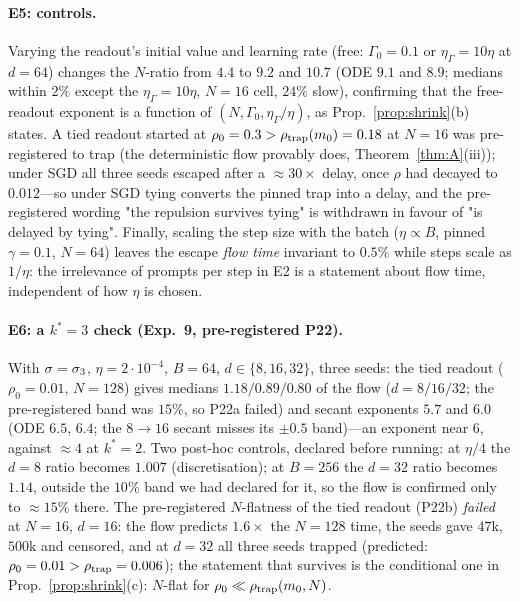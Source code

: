\paragraph{E5: controls.}
Varying the readout's initial value and learning rate (free: $\Gamma_0=0.1$ or $\eta_\Gamma=10\eta$ at $d=64$) changes the $N$-ratio from $4.4$ to
$9.2$ and $10.7$ (ODE $9.1$ and $8.9$; medians within $2\%$ except the $\eta_\Gamma=10\eta$, $N=16$ cell, $24\%$ slow), confirming that the
free-readout exponent is a function of $(N,\Gamma_0,\eta_\Gamma/\eta)$, as Prop.~\ref{prop:shrink}(b) states. A tied readout started at $\rho_0=0.3>\rho_{\rm trap}(m_0)=0.18$ at $N=16$ was pre-registered to trap (the deterministic flow provably does, Theorem~\ref{thm:A}(iii)); under SGD all three seeds escaped after a $\approx30\times$ delay, once $\rho$ had
decayed to $0.012$---so under SGD tying converts the pinned trap into a delay, and the pre-registered wording "the repulsion survives tying" is
withdrawn in favour of "is delayed by tying". Finally, scaling the step size with the batch ($\eta\propto B$, pinned $\gamma=0.1$, $N=64$)
leaves the escape \emph{flow time} invariant to $0.5\%$ while steps scale as $1/\eta$: the irrelevance of prompts per step in E2 is a
statement about flow time, independent of how $\eta$ is chosen.

\paragraph{E6: a $k^*=3$ check (Exp.~9, pre-registered P22).}
With $\sigma=\sigma_3$, $\eta=2\cdot10^{-4}$, $B=64$, $d\in\{8,16,32\}$, three seeds: the tied readout ($\rho_0=0.01$, $N=128$)
gives medians $1.18/0.89/0.80$ of the flow ($d=8/16/32$; the pre-registered band was $15\%$, so P22a failed) and secant exponents $5.7$ and $6.0$ (ODE $6.5$, $6.4$; the $8\to16$ secant misses its $\pm0.5$ band)---an exponent near $6$, against $\approx4$ at $k^*=2$. Two post-hoc controls, declared before running: at $\eta/4$ the $d=8$ ratio becomes $1.007$ (discretisation); at $B=256$ the $d=32$ ratio becomes $1.14$, outside the $10\%$ band we had declared for it, so the flow is confirmed only to $\approx15\%$ there.
The pre-registered $N$-flatness of the tied readout (P22b) \emph{failed} at $N=16$, $d=16$: the flow predicts $1.6\times$ the $N=128$ time,
the seeds gave $47$k, $500$k and censored, and at $d=32$ all three seeds trapped (predicted: $\rho_0=0.01>\rho_{\rm trap}=0.006$); the statement that survives is the conditional one in
Prop.~\ref{prop:shrink}(c): $N$-flat for $\rho_0\ll\rho_{\rm trap}(m_0,N)$.

